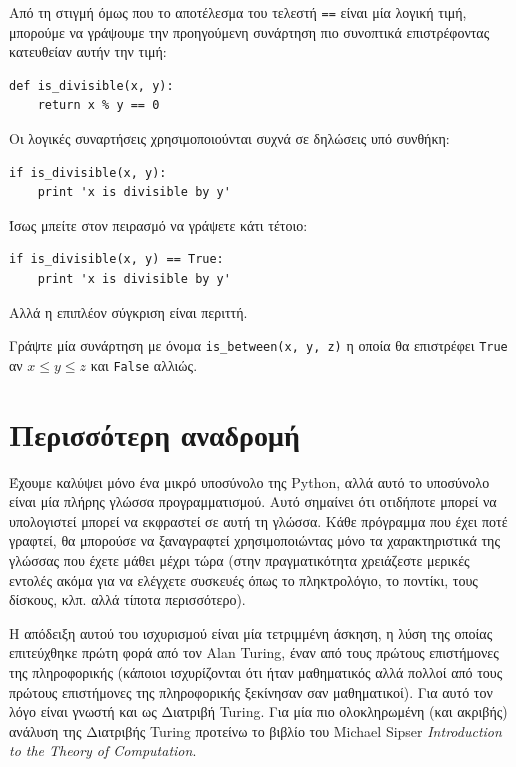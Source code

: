 \documentclass[10pt]{book}
\begin{document}
Από τη στιγμή όμως που το αποτέλεσμα του τελεστή {\tt ==} είναι μία λογική τιμή, μπορούμε να γράψουμε την προηγούμενη συνάρτηση πιο συνοπτικά επιστρέφοντας κατευθείαν αυτήν την τιμή:

\begin{verbatim}
def is_divisible(x, y):
    return x % y == 0
\end{verbatim}
%

Οι λογικές συναρτήσεις χρησιμοποιούνται συχνά σε δηλώσεις υπό συνθήκη:

\begin{verbatim}
if is_divisible(x, y):
    print 'x is divisible by y'
\end{verbatim}
%

Ίσως μπείτε στον πειρασμό να γράψετε κάτι τέτοιο:

\begin{verbatim}
if is_divisible(x, y) == True:
    print 'x is divisible by y'
\end{verbatim}
%

Αλλά η επιπλέον σύγκριση είναι περιττή.
\\
\begin{exercise}

Γράψτε μία συνάρτηση με όνομα \verb"is_between(x, y, z)" η οποία θα
επιστρέφει {\tt True} αν $x \le y \le z$  και {\tt False} αλλιώς.
\end{exercise}


\section{Περισσότερη αναδρομή}
\label{more.recursion}

Έχουμε καλύψει μόνο ένα μικρό υποσύνολο της Python, αλλά
αυτό το υποσύνολο είναι μία πλήρης γλώσσα προγραμματισμού. Αυτό 
σημαίνει ότι οτιδήποτε μπορεί να υπολογιστεί μπορεί να εκφραστεί σε
αυτή τη γλώσσα. Κάθε πρόγραμμα που έχει ποτέ γραφτεί, θα μπορούσε να
ξαναγραφτεί χρησιμοποιώντας μόνο τα χαρακτηριστικά της γλώσσας που
έχετε μάθει μέχρι τώρα (στην πραγματικότητα χρειάζεστε μερικές εντολές
ακόμα για να ελέγχετε συσκευές όπως το πληκτρολόγιο, το ποντίκι, τους δίσκους,
κλπ. αλλά τίποτα περισσότερο).

Η απόδειξη αυτού του ισχυρισμού είναι μία τετριμμένη άσκηση, η λύση της οποίας
επιτεύχθηκε πρώτη φορά από τον Alan Turing, έναν από τους πρώτους
επιστήμονες της πληροφορικής (κάποιοι ισχυρίζονται ότι ήταν μαθηματικός
αλλά πολλοί από τους πρώτους επιστήμονες της πληροφορικής ξεκίνησαν σαν μαθηματικοί). Για αυτό τον λόγο είναι γνωστή και ως Διατριβή Turing. Για μία πιο ολοκληρωμένη (και ακριβής) ανάλυση της Διατριβής  Turing προτείνω το βιβλίο του Michael Sipser {\em Introduction to the Theory of Computation}.
\end{document}
